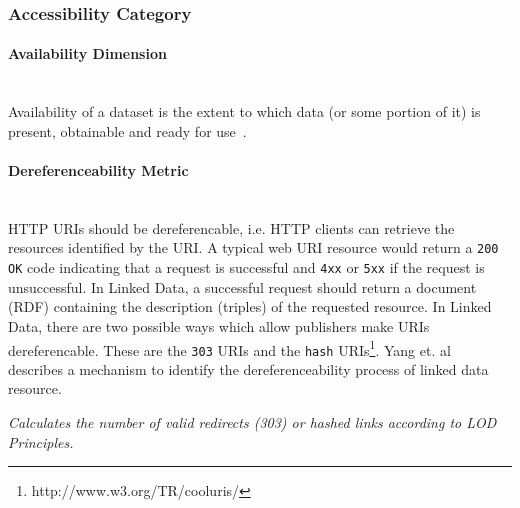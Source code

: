 
\subsubsection{Accessibility Category}
\label{sec:Accessibility} 

\paragraph{Availability Dimension}~\\%
Availability of a dataset is the extent to which data (or some portion of it) is present, obtainable and ready for use~\cite{Zaveri2012:LODQ}.

\paragraph{Dereferenceability Metric} ~\\ %
HTTP URIs should be dereferencable, i.e. HTTP clients can retrieve the resources identified by the URI.
A typical web URI resource would return a \texttt{200 OK} code indicating that a request is successful and \texttt{4xx} or \texttt{5xx} if the request is unsuccessful. 
In Linked Data, a successful request should return a document (RDF) containing the description (triples) of the requested resource.
In Linked Data, there are two possible ways which allow publishers make URIs dereferencable.
These are the \texttt{303} URIs and the \texttt{hash} URIs\footnote{http://www.w3.org/TR/cooluris/}.
Yang et. al~\cite{Yang2011} describes a mechanism to identify the dereferenceability process of linked data resource.
\begin{mdframed}[style=metricdefinition]
\emph{Calculates the number of valid redirects (303) or hashed links according to LOD Principles.}
\end{mdframed}

